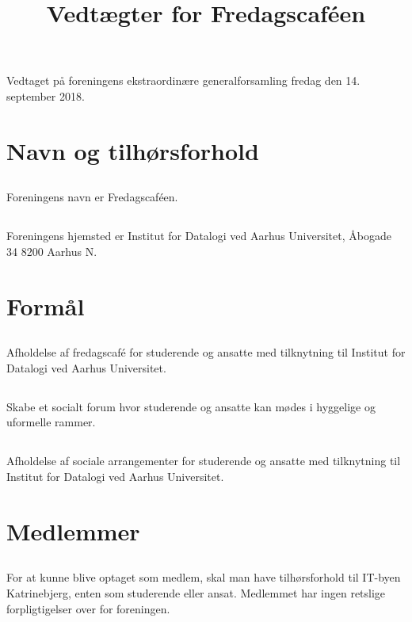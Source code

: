 \documentclass[danish,a4paper,twocolumn,oneside,article]{memoir}
\title{Vedtægter for Fredagscaféen}
\author{}
\date{}
\begin{document}
\maketitle
\newpage

Vedtaget på foreningens ekstraordinære generalforsamling fredag den 14. september 2018.

\chapter{Navn og tilhørsforhold}

\section{} Foreningens navn er Fredagscaféen.

\section{} Foreningens hjemsted er Institut for Datalogi ved Aarhus Universitet, Åbogade 34 8200 Aarhus N.

\chapter{Formål}

\section{} Afholdelse af fredagscafé for studerende og ansatte med tilknytning til Institut for Datalogi
ved Aarhus Universitet.

\section{} Skabe et socialt forum hvor studerende og ansatte kan mødes i hyggelige og uformelle rammer.

\section{} Afholdelse af sociale arrangementer for studerende og ansatte med tilknytning til Institut for Datalogi
ved Aarhus Universitet.


\chapter{Medlemmer}

\section{} For at kunne blive optaget som medlem, skal man have tilhørsforhold til IT-byen Katrinebjerg,
enten som studerende eller ansat. Medlemmet har ingen retslige forpligtigelser over for foreningen.
\end{document}
